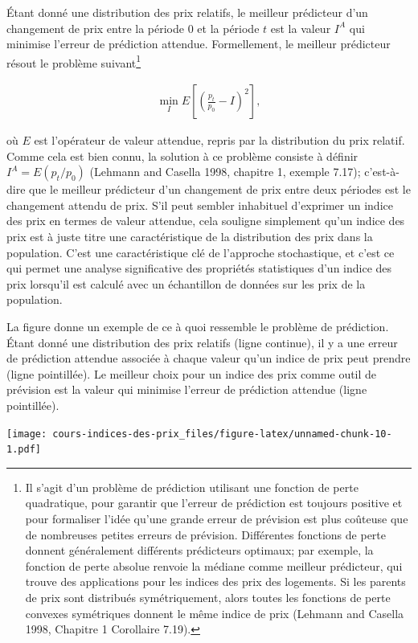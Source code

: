 \documentclass[]{article}
\begin{document}
Étant donné une distribution des prix relatifs, le meilleur prédicteur d'un changement de prix entre la période 0 et la période \(t\) est la valeur \(I^{A}\) qui minimise l'erreur de prédiction attendue. Formellement, le meilleur prédicteur résout le problème suivant\footnote{Il s'agit d'un problème de prédiction utilisant une fonction de perte quadratique, pour garantir que l'erreur de prédiction est toujours positive et pour formaliser l'idée qu'une grande erreur de prévision est plus coûteuse que de nombreuses petites erreurs de prévision. Différentes fonctions de perte donnent généralement différents prédicteurs optimaux; par exemple, la fonction de perte absolue renvoie la médiane comme meilleur prédicteur, qui trouve des applications pour les indices des prix des logements. Si les parents de prix sont distribués symétriquement, alors toutes les fonctions de perte convexes symétriques donnent le même indice de prix (Lehmann and Casella 1998, Chapitre 1 Corollaire 7.19).}

\begin{align*}
\min_{I} E\left[\left(\frac{p_{t}}{p_{0}} - I \right)^{2} \right],
\end{align*}

où \(E\) est l'opérateur de valeur attendue, repris par la distribution du prix relatif. Comme cela est bien connu, la solution à ce problème consiste à définir \(I^{A} = E(p_{t} / p_{0})\) (Lehmann and Casella 1998, chapitre 1, exemple 7.17); c'est-à-dire que le meilleur prédicteur d'un changement de prix entre deux périodes est le changement attendu de prix. S'il peut sembler inhabituel d'exprimer un indice des prix en termes de valeur attendue, cela souligne simplement qu'un indice des prix est à juste titre une caractéristique de la distribution des prix dans la population. C'est une caractéristique clé de l'approche stochastique, et c'est ce qui permet une analyse significative des propriétés statistiques d'un indice des prix lorsqu'il est calculé avec un échantillon de données sur les prix de la population.

La figure donne un exemple de ce à quoi ressemble le problème de prédiction. Étant donné une distribution des prix relatifs (ligne continue), il y a une erreur de prédiction attendue associée à chaque valeur qu'un indice de prix peut prendre (ligne pointillée). Le meilleur choix pour un indice des prix comme outil de prévision est la valeur qui minimise l'erreur de prédiction attendue (ligne pointillée).

\texttt{[image: cours-indices-des-prix\_files/figure-latex/unnamed-chunk-10-1.pdf]}
\end{document}

